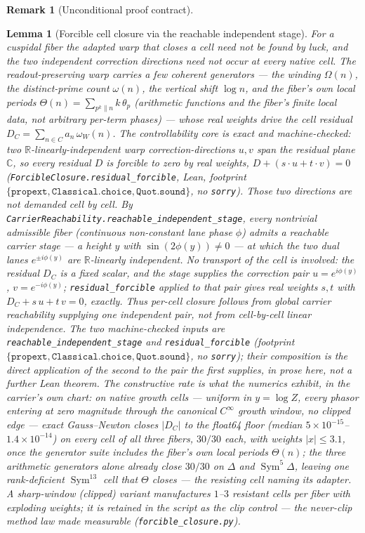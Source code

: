 \documentclass[11pt]{article}
\newtheorem{lemma}[theorem]{Lemma}
\theoremstyle{definition}
\newtheorem{remark}[theorem]{Remark}
\newcommand{\Sym}{\operatorname{Sym}}
\begin{document}
\begin{remark}[Unconditional proof contract]
\begin{enumerate}
\begin{lemma}[Forcible cell closure via the reachable independent stage]\label{lem:forcible}
For a cuspidal fiber the adapted warp that closes a cell need not be found by luck, and the two independent
correction directions need \emph{not} occur at every native cell. The readout-preserving warp carries a few
\emph{coherent} generators --- the winding $\Omega(n)$, the distinct-prime count $\omega(n)$, the vertical shift
$\log n$, and the fiber's own local periods $\Theta(n)=\sum_{p^k\|n}k\,\theta_p$ (arithmetic functions and the
fiber's finite local data, not arbitrary per-term phases) --- whose real weights drive the cell residual
$D_C=\sum_{n\in C}a_n\,\omega_W(n)$. The controllability core is exact and machine-checked: two
$\mathbb R$-linearly-independent warp correction-directions $u,v$ span the residual plane $\mathbb C$, so
\emph{every} residual $D$ is forcible to zero by real weights, $D+(s\!\cdot\! u+t\!\cdot\! v)=0$
(\texttt{ForcibleClosure.residual\_forcible}, Lean, footprint
$\{\texttt{propext},\texttt{Classical.choice},\texttt{Quot.sound}\}$, no \texttt{sorry}). Those two directions are
not demanded cell by cell. By \texttt{CarrierReachability.reachable\_independent\_stage}, every nontrivial
admissible fiber (continuous non-constant lane phase $\phi$) admits a reachable carrier \emph{stage} --- a height
$y$ with $\sin(2\phi(y))\neq0$ --- at which the two dual lanes $e^{\pm i\phi(y)}$ are $\mathbb R$-linearly
independent. No transport of the cell is involved: the residual $D_C$ is a fixed scalar, and the stage supplies
the correction pair $u=e^{i\phi(y)}$, $v=e^{-i\phi(y)}$; \texttt{residual\_forcible} applied to that pair gives
real weights $s,t$ with $D_C+s\,u+t\,v=0$, exactly. Thus per-cell closure follows from \emph{global} carrier
reachability supplying one independent pair, \emph{not} from cell-by-cell linear independence. The two
machine-checked inputs are \texttt{reachable\_independent\_stage} and \texttt{residual\_forcible} (footprint
$\{\texttt{propext},\texttt{Classical.choice},\texttt{Quot.sound}\}$, no \texttt{sorry}); their composition is
the direct application of the second to the pair the first supplies, in prose here, not a further Lean theorem.
The constructive rate is what the numerics exhibit, \emph{in the carrier's own chart}: on native growth
cells --- uniform in $y=\log Z$, every phasor entering at zero magnitude through the canonical $C^{\infty}$
growth window, no clipped edge --- exact Gauss--Newton closes $|D_C|$ to the float64 floor (median
$5\times10^{-15}$--$1.4\times10^{-14}$) on \emph{every} cell of all three fibers, $30/30$ each, with weights
$|x|\le3.1$, once the generator suite includes the fiber's own local periods $\Theta(n)$; the three arithmetic
generators alone already close $30/30$ on $\Delta$ and $\Sym^5\Delta$, leaving one rank-deficient
$\Sym^{13}$ cell that $\Theta$ closes --- the resisting cell naming its adapter. A sharp-window (clipped)
variant manufactures $1$--$3$ resistant cells per fiber with exploding weights; it is retained in the script
as the clip control --- the never-clip method law made measurable (\texttt{forcible\_closure.py}).
\end{lemma}


\end{enumerate}
\end{remark}
\end{document}
